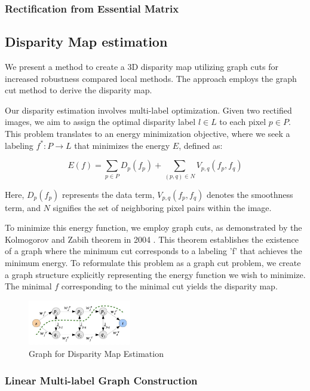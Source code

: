 \documentclass[10pt,twocolumn,letterpaper]{article}
\begin{document}
\subsubsection{Rectification from Essential Matrix}
\subsection{Disparity Map estimation}


We present a method to create a 3D disparity map utilizing graph cuts for increased robustness compared local methods. The approach employs the graph cut method to derive the disparity map.

Our disparity estimation involves multi-label optimization. Given two rectified images, we aim to assign the optimal disparity label \(l \in L\) to each pixel \(p \in P\). This problem translates to an energy minimization objective, where we seek a labeling \(f^* : P \rightarrow L\) that minimizes the energy \(E\), defined as:

\[
E(f) = \sum_{p \in P} D_p(f_p) + \sum_{(p,q) \in N} V_{p,q}(f_p,f_q)
\]

Here, \(D_p(f_p)\) represents the data term, \(V_{p,q}(f_p,f_q)\) denotes the smoothness term, and \(N\) signifies the set of neighboring pixel pairs within the image.

To minimize this energy function, we employ graph cuts, as demonstrated by the Kolmogorov and Zabih theorem in 2004 \cite{kolomogorov}. This theorem establishes the existence of a graph where the minimum cut corresponds to a labeling 'f' that achieves the minimum energy. To reformulate this problem as a graph cut problem, we create a graph structure explicitly representing the energy function we wish to minimize. The minimal \(f\) corresponding to the minimal cut yields the disparity map.
\begin{figure}[htbp]
    \centering
    \includegraphics[width=0.4\textwidth]{graph.jpeg}
    \caption{Graph for Disparity Map Estimation}
    \label{fig:graph}
\end{figure}

\subsubsection{Linear Multi-label Graph Construction}
\end{document}
